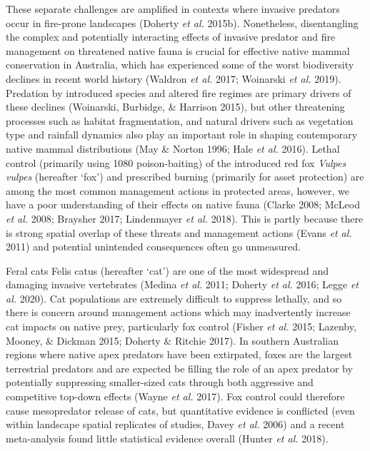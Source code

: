\documentclass[11pt,a4paper,titlepage,twoside,openright]{style/unimelbthesis}
\begin{document}
\begin{mainmatter}
These separate challenges are amplified in contexts where invasive predators occur in fire-prone landscapes (Doherty \emph{et al.} 2015b). Nonetheless, disentangling the complex and potentially interacting effects of invasive predator and fire management on threatened native fauna is crucial for effective native mammal conservation in Australia, which has experienced some of the worst biodiversity declines in recent world history (Waldron \emph{et al.} 2017; Woinarski \emph{et al.} 2019). Predation by introduced species and altered fire regimes are primary drivers of these declines (Woinarski, Burbidge, \& Harrison 2015), but other threatening processes such as habitat fragmentation, and natural drivers such as vegetation type and rainfall dynamics also play an important role in shaping contemporary native mammal distributions (May \& Norton 1996; Hale \emph{et al.} 2016). Lethal control (primarily using 1080 poison-baiting) of the introduced red fox \emph{Vulpes vulpes} (hereafter `fox') and prescribed burning (primarily for asset protection) are among the most common management actions in protected areas, however, we have a poor understanding of their effects on native fauna (Clarke 2008; McLeod \emph{et al.} 2008; Braysher 2017; Lindenmayer \emph{et al.} 2018). This is partly because there is strong spatial overlap of these threats and management actions (Evans \emph{et al.} 2011) and potential unintended consequences often go unmeasured.

Feral cats Felis catus (hereafter `cat') are one of the most widespread and damaging invasive vertebrates (Medina \emph{et al.} 2011; Doherty \emph{et al.} 2016; Legge \emph{et al.} 2020). Cat populations are extremely difficult to suppress lethally, and so there is concern around management actions which may inadvertently increase cat impacts on native prey, particularly fox control (Fisher \emph{et al.} 2015; Lazenby, Mooney, \& Dickman 2015; Doherty \& Ritchie 2017). In southern Australian regions where native apex predators have been extirpated, foxes are the largest terrestrial predators and are expected be filling the role of an apex predator by potentially suppressing smaller-sized cats through both aggressive and competitive top-down effects (Wayne \emph{et al.} 2017). Fox control could therefore cause mesopredator release of cats, but quantitative evidence is conflicted (even within landscape spatial replicates of studies, Davey \emph{et al.} 2006) and a recent meta-analysis found little statistical evidence overall (Hunter \emph{et al.} 2018).


\end{mainmatter}
\end{document}
